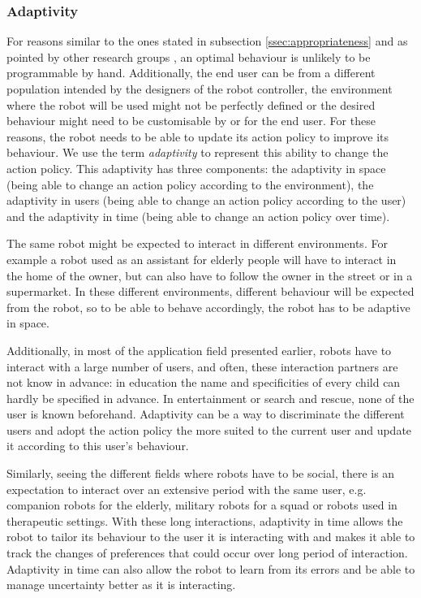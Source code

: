 \subsubsection{Adaptivity}	\label{ssec:adap}

    For reasons similar to the ones stated in subsection
    \ref{ssec:appropriateness} and as pointed by other research groups
    \citep{argall2009survey, hoffman2016openwoz}, an optimal behaviour is
    unlikely to be programmable by hand. Additionally, the end user can be from
    a different population intended by the designers of the robot controller,
    the environment where the robot will be used might not be perfectly defined
    or the desired behaviour might need to be customisable by or for the end
    user. For these reasons, the  robot needs to be able to update its action
    policy to improve its behaviour. We use the term \emph{adaptivity} to
    represent this ability to change the action policy. This adaptivity has
    three components: the adaptivity in space (being able to change an action
    policy according to the environment), the adaptivity in users (being able to
    change an action policy according to the user) and the adaptivity in time
    (being able to change an action policy over time). 

    The same robot might be expected to interact in different environments. For
    example a robot used as an assistant for elderly people will have to
    interact in the home of the owner, but can also have to follow the owner in
    the street or in a supermarket. In these different environments, different
    behaviour will be expected from the robot, so to be able to behave
    accordingly, the robot has to be adaptive in space.

    Additionally, in most of the application field presented earlier, robots
    have to interact with a large number of users, and often, these interaction
    partners are not know in advance: in education the name and specificities of
    every child can hardly be specified in advance. In entertainment or search
    and rescue, none of the user is known beforehand. Adaptivity can be a way to
    discriminate the different users and adopt the action policy the more suited
    to the current user and update it according to this user's behaviour.

    Similarly, seeing the different fields where robots have to be social, there
    is an expectation to interact over an extensive period with the same user,
    e.g. companion robots for the elderly, military robots for a squad or robots
    used in therapeutic settings. With these long interactions, adaptivity in
    time allows the robot to tailor its behaviour to the user it is interacting
    with and makes it able to track the changes of preferences that could occur
    over long period of interaction. Adaptivity in time can also allow the robot
    to learn from its errors and be able to manage uncertainty better as it is
    interacting.

